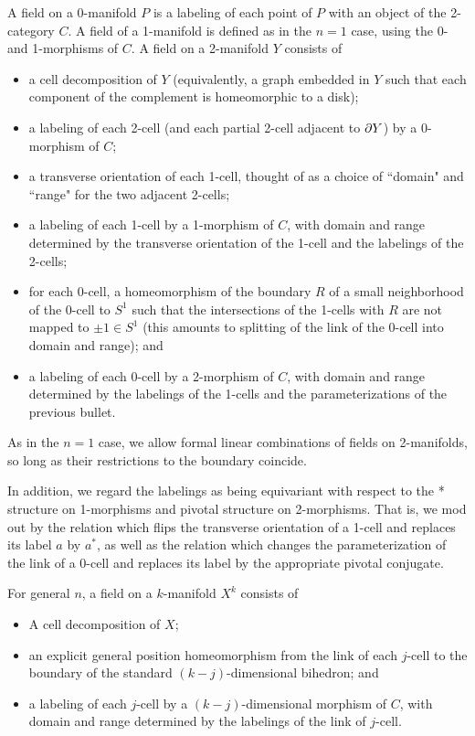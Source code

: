 A field on a 0-manifold $P$ is a labeling of each point of $P$ with
an object of the 2-category $C$.
A field of a 1-manifold is defined as in the $n=1$ case, using the 0- and 1-morphisms of $C$.
A field on a 2-manifold $Y$ consists of
\begin{itemize}
    \item a cell decomposition of $Y$ (equivalently, a graph embedded in $Y$ such
that each component of the complement is homeomorphic to a disk);
    \item a labeling of each 2-cell (and each partial 2-cell adjacent to $\partial Y$)
by a 0-morphism of $C$;
    \item a transverse orientation of each 1-cell, thought of as a choice of
``domain" and ``range" for the two adjacent 2-cells;
    \item a labeling of each 1-cell by a 1-morphism of $C$, with
domain and range determined by the transverse orientation of the 1-cell
and the labelings of the 2-cells;
    \item for each 0-cell, a homeomorphism of the boundary $R$ of a small neighborhood
of the 0-cell to $S^1$ such that the intersections of the 1-cells with $R$ are not mapped
to $\pm 1 \in S^1$
(this amounts to splitting of the link of the 0-cell into domain and range); and
    \item a labeling of each 0-cell by a 2-morphism of $C$, with domain and range
determined by the labelings of the 1-cells and the parameterizations of the previous
bullet.
\end{itemize}

As in the $n=1$ case, we allow formal linear combinations of fields on 2-manifolds, 
so long as their restrictions to the boundary coincide.

In addition, we regard the labelings as being equivariant with respect to the * structure
on 1-morphisms and pivotal structure on 2-morphisms.
That is, we mod out by the relation which flips the transverse orientation of a 1-cell 
and replaces its label $a$ by $a^*$, as well as the relation which changes the parameterization of the link
of a 0-cell and replaces its label by the appropriate pivotal conjugate.

\medskip

For general $n$, a field on a $k$-manifold $X^k$ consists of
\begin{itemize}
    \item A cell decomposition of $X$;
    \item an explicit general position homeomorphism from the link of each $j$-cell
to the boundary of the standard $(k-j)$-dimensional bihedron; and
    \item a labeling of each $j$-cell by a $(k-j)$-dimensional morphism of $C$, with
domain and range determined by the labelings of the link of $j$-cell.
\end{itemize}



